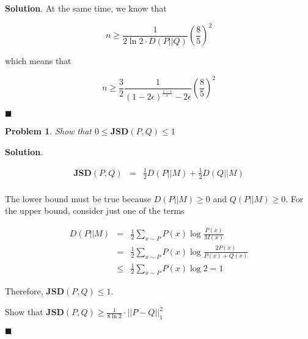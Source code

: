 \documentclass[12pt]{article}
\newtheorem{p}{Problem}[section]
\theoremstyle{definition}
\newenvironment{s}{%
        \begin{trivlist} \item \textbf{Solution}. }{%
            \hspace*{\fill} $\blacksquare$\end{trivlist}}%
\begin{document}
{\begin{s}
At the same time, we know that

\begin{equation*}
n \geq \frac{1}{2\ln 2 \cdot D(P||Q)}\left(\frac{8}{5}\right)^{2}
\end{equation*}

which means that

\begin{equation*}
n \geq \frac{3}{2}\frac{1}{(1-2\epsilon)^{\frac{1-\epsilon}{\epsilon}}-2\epsilon}\left(\frac{8}{5}\right)^{2}
\end{equation*}

\end{s}

\begin{p}
Show that $0 \leq \mathbf{JSD}(P,Q) \leq 1$
\end{p}

\begin{s}

\begin{eqnarray*}
\mathbf{JSD}(P,Q) &=& \frac{1}{2}D(P||M) + \frac{1}{2}D(Q||M)\\
\end{eqnarray*}

The lower bound must be true because $D(P||M) \geq 0$ and $Q(P||M) \geq 0$. For the upper bound, consider just one of the terms

\begin{eqnarray*}
D(P||M) &=& \frac{1}{2}\sum_{x\sim P} P(x)\log \frac{P(x)}{M(x)}\\
&=&  \frac{1}{2}\sum_{x\sim P} P(x)\log \frac{2P(x)}{P(x)+Q(x)}\\
&\leq &  \frac{1}{2}\sum_{x\sim P} P(x)\log 2 = 1
\end{eqnarray*}

Therefore, $\mathbf{JSD}(P,Q) \leq 1$.

Show that $\mathbf{JSD}(P,Q) \geq \frac{1}{8\ln 2} \cdot ||P-Q||_{1}^{2}$

\end{s}
\end{document}
